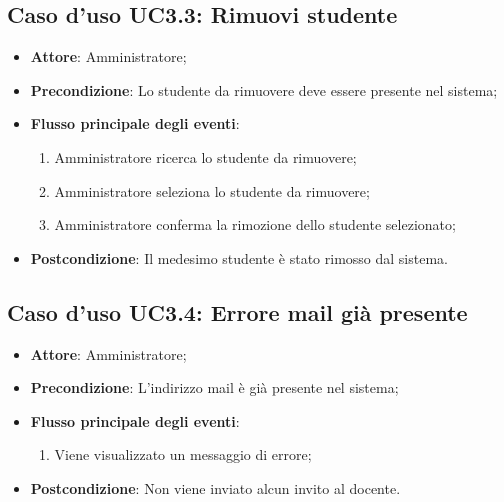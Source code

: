 \documentclass[12pt,a4paper]{article}
\begin{document}
\subsection{Caso d'uso UC3.3: Rimuovi  studente}

\begin{itemize}

\item \textbf{Attore}: Amministratore; 
\item \textbf{Precondizione}: Lo studente da rimuovere deve essere presente nel sistema;

\item \textbf{Flusso principale degli eventi}:
\begin{enumerate}
	\item Amministratore ricerca lo studente da rimuovere;
	\item Amministratore seleziona lo studente da rimuovere;
	\item Amministratore conferma la rimozione dello studente selezionato;
	
\end{enumerate}
\item \textbf{Postcondizione}: Il medesimo studente è stato rimosso dal sistema.
\end{itemize}
\hypertarget{UC3.4}{}
\subsection{Caso d'uso UC3.4: Errore mail già presente}

\begin{itemize}

\item \textbf{Attore}: Amministratore; 
\item \textbf{Precondizione}: L'indirizzo mail è già presente nel sistema;

\item \textbf{Flusso principale degli eventi}:
\begin{enumerate}
	\item Viene visualizzato un messaggio di errore;
	
\end{enumerate}
\item \textbf{Postcondizione}: Non viene inviato alcun invito al docente.
\end{itemize}
\hypertarget{UC4}{}
\end{document}
